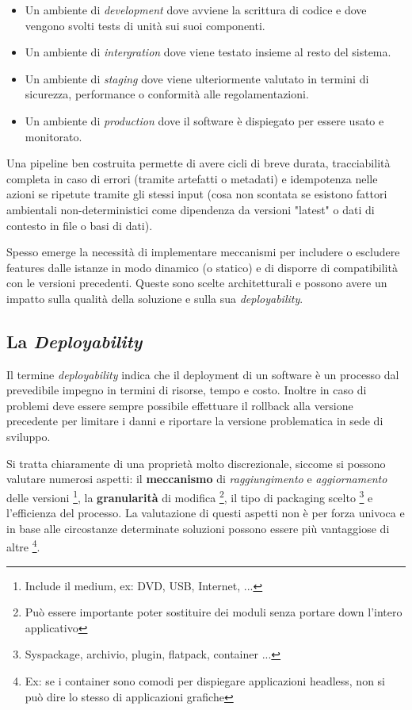 \documentclass[a4paper,11pt,oneside, table]{article}
\begin{document}
  \begin{itemize}
    \item Un ambiente di \textit{development} dove avviene la scrittura di codice e dove vengono svolti tests di unit\`a sui suoi componenti.
    \item Un ambiente di \textit{intergration} dove viene testato insieme al resto del sistema.
    \item Un ambiente di \textit{staging} dove viene ulteriormente valutato in termini di sicurezza, performance o conformit\`a alle regolamentazioni.
    \item Un ambiente di \textit{production} dove il software \`e dispiegato per essere usato e monitorato.
  \end{itemize}

  Una pipeline ben costruita permette di avere cicli di breve durata, tracciabilit\`a completa in caso di errori (tramite artefatti o metadati) e idempotenza nelle azioni se ripetute tramite gli stessi input (cosa non scontata se esistono fattori ambientali non-deterministici come dipendenza da versioni "latest" o dati di contesto in file o basi di dati).

  Spesso emerge la necessit\`a di implementare meccanismi per includere o escludere features dalle istanze in modo dinamico (o statico) e di disporre di compatibilit\`a con le versioni precedenti. Queste sono scelte architetturali e possono avere un impatto sulla qualit\`a della soluzione e sulla sua \textit{deployability}.

  \subsection{La \textit{Deployability}}

  Il termine \textit{deployability} indica che il deployment di un software \`e un processo dal prevedibile impegno in termini di risorse, tempo e costo. Inoltre in caso di problemi deve essere sempre possibile effettuare il rollback alla versione precedente per limitare i danni e riportare la versione problematica in sede di sviluppo.

  Si tratta chiaramente di una propriet\`a molto discrezionale, siccome si possono valutare numerosi aspetti: il \textbf{meccanismo} di \textit{raggiungimento} e \textit{aggiornamento} delle versioni \footnote{Include il medium, ex: DVD, USB, Internet, ...}, la \textbf{granularit\`a} di modifica \footnote{Pu\`o essere importante poter sostituire dei moduli senza portare down l'intero applicativo}, il tipo di packaging scelto \footnote{Syspackage, archivio, plugin, flatpack, container ...} e l'efficienza del processo. La valutazione di questi aspetti non \`e per forza univoca e in base alle circostanze determinate soluzioni possono essere pi\`u vantaggiose di altre \footnote{Ex: se i container sono comodi per dispiegare applicazioni headless, non si pu\`o dire lo stesso di applicazioni grafiche}.
\end{document}
